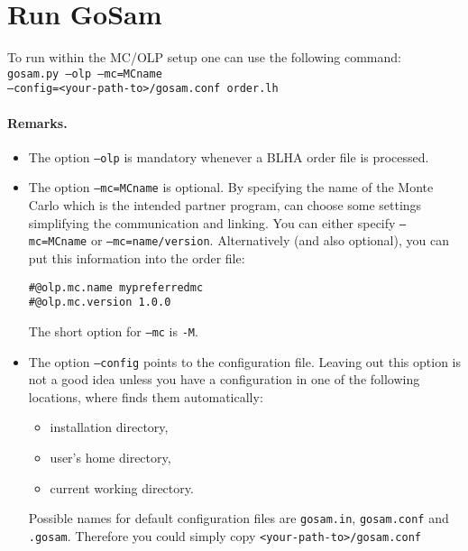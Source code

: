 \clearpage

\section{Run GoSam}
To run \gosam{} within the MC/OLP setup one can use the following command:\\
{\tt gosam.py --olp --mc=MCname }\\
{\tt    --config=<your-path-to>/gosam.conf order.lh}

\paragraph{Remarks.}
\begin{itemize}
\item The option \texttt{--olp} is mandatory whenever 
   a BLHA order file is processed.
\item The option \texttt{--mc=MCname} is optional. By specifying the
   name of the Monte Carlo which is the intended partner program,
   \gosam{} can choose some settings simplifying the communication and linking.
   You can either specify \texttt{--mc=MCname} or \texttt{--mc=name/version}.
   Alternatively (and also optional),
   you can put this information into the order file:
\begin{lstlisting}
#@olp.mc.name mypreferredmc
#@olp.mc.version 1.0.0
\end{lstlisting}
   The short option for \texttt{--mc} is \texttt{-M}.
\item The option \texttt{--config} points to the configuration file.
   Leaving out this option is not a good idea unless you have a configuration
   in one of the following locations, where \gosam{} finds them automatically:
   \begin{itemize}
   \item \gosam{} installation directory,
   \item user's home directory,
   \item current working directory.
   \end{itemize}
   Possible names for default configuration files are \texttt{gosam.in},
   \texttt{gosam.conf} and \texttt{.gosam}. Therefore you could simply copy
   \texttt{<your-path-to>/\hspace{0pt}gosam.conf}

\end{itemize}

